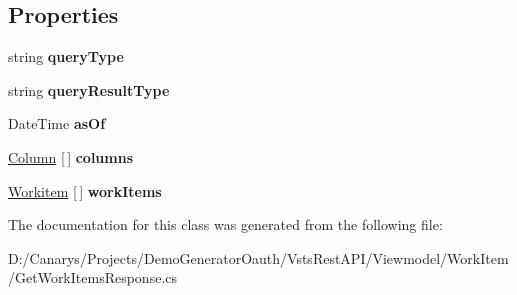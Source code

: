 \subsection*{Properties}
\begin{DoxyCompactItemize}
\item 
\mbox{\label{class_vsts_rest_a_p_i_1_1_viewmodel_1_1_work_item_1_1_get_work_items_response_1_1_results_a4e60d4ceb5b0b5cee6ba2a1a3b819aa8}} 
string {\bfseries query\+Type}
\item 
\mbox{\label{class_vsts_rest_a_p_i_1_1_viewmodel_1_1_work_item_1_1_get_work_items_response_1_1_results_a3fad88481a7cd78c973803c290568784}} 
string {\bfseries query\+Result\+Type}
\item 
\mbox{\label{class_vsts_rest_a_p_i_1_1_viewmodel_1_1_work_item_1_1_get_work_items_response_1_1_results_ab211d9a35f8657ed061afc21ed638cfe}} 
Date\+Time {\bfseries as\+Of}
\item 
\mbox{\label{class_vsts_rest_a_p_i_1_1_viewmodel_1_1_work_item_1_1_get_work_items_response_1_1_results_a94d45e36b688ac13be0872be31132869}} 
\mbox{\hyperlink{class_vsts_rest_a_p_i_1_1_viewmodel_1_1_work_item_1_1_get_work_items_response_1_1_column}{Column}} \mbox{[}$\,$\mbox{]} {\bfseries columns}
\item 
\mbox{\label{class_vsts_rest_a_p_i_1_1_viewmodel_1_1_work_item_1_1_get_work_items_response_1_1_results_ac9b660c5081d01e40cc2492f6b4cc445}} 
\mbox{\hyperlink{class_vsts_rest_a_p_i_1_1_viewmodel_1_1_work_item_1_1_get_work_items_response_1_1_workitem}{Workitem}} \mbox{[}$\,$\mbox{]} {\bfseries work\+Items}
\end{DoxyCompactItemize}


The documentation for this class was generated from the following file\+:\begin{DoxyCompactItemize}
\item 
D\+:/\+Canarys/\+Projects/\+Demo\+Generator\+Oauth/\+Vsts\+Rest\+A\+P\+I/\+Viewmodel/\+Work\+Item/Get\+Work\+Items\+Response.\+cs\end{DoxyCompactItemize}
